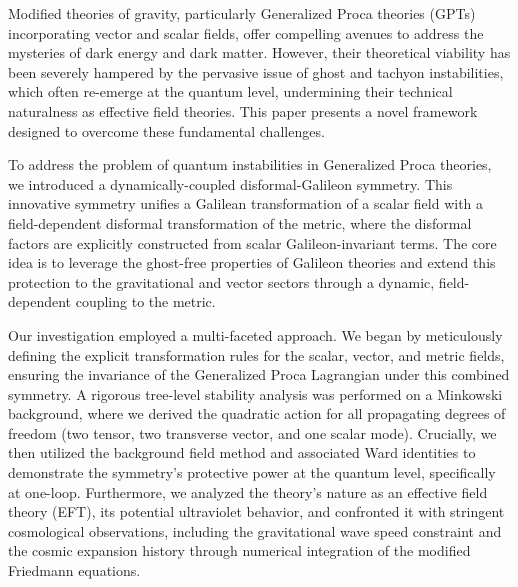 \documentclass[twocolumn]{aastex631}
\begin{document}
Modified theories of gravity, particularly Generalized Proca theories (GPTs) incorporating vector and scalar fields, offer compelling avenues to address the mysteries of dark energy and dark matter. However, their theoretical viability has been severely hampered by the pervasive issue of ghost and tachyon instabilities, which often re-emerge at the quantum level, undermining their technical naturalness as effective field theories. This paper presents a novel framework designed to overcome these fundamental challenges.

To address the problem of quantum instabilities in Generalized Proca theories, we introduced a dynamically-coupled disformal-Galileon symmetry. This innovative symmetry unifies a Galilean transformation of a scalar field with a field-dependent disformal transformation of the metric, where the disformal factors are explicitly constructed from scalar Galileon-invariant terms. The core idea is to leverage the ghost-free properties of Galileon theories and extend this protection to the gravitational and vector sectors through a dynamic, field-dependent coupling to the metric.

Our investigation employed a multi-faceted approach. We began by meticulously defining the explicit transformation rules for the scalar, vector, and metric fields, ensuring the invariance of the Generalized Proca Lagrangian under this combined symmetry. A rigorous tree-level stability analysis was performed on a Minkowski background, where we derived the quadratic action for all propagating degrees of freedom (two tensor, two transverse vector, and one scalar mode). Crucially, we then utilized the background field method and associated Ward identities to demonstrate the symmetry's protective power at the quantum level, specifically at one-loop. Furthermore, we analyzed the theory's nature as an effective field theory (EFT), its potential ultraviolet behavior, and confronted it with stringent cosmological observations, including the gravitational wave speed constraint and the cosmic expansion history through numerical integration of the modified Friedmann equations.
\end{document}
